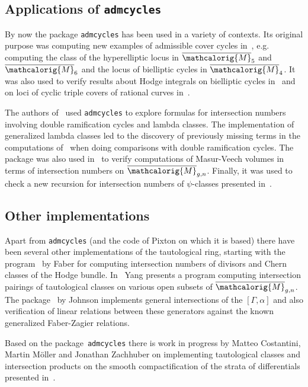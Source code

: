 \documentclass[11pt]{article}
\newcommand{\M}{\ensuremath{\overline{\mathcalorig{M}}}}
\newcommand{\admcycles}{\texttt{admcycles}}
\begin{document}
\subsection*{Applications of \admcycles{}}
By now the package \admcycles{} has been used in a variety of contexts. Its original purpose was computing new examples of admissible cover cycles in~\cite{schmittvanzelm}, e.g. computing the class of the hyperelliptic locus in $\overline{\mathcalorig{M}}_5$ and $\overline{\mathcalorig{M}}_6$ and the locus of bielliptic cycles in $\overline{\mathcalorig{M}}_4$. It was also used to verify results about Hodge integrals on bielliptic cycles in~\cite{hurwitzhodge} and on loci of cyclic triple covers of rational curves in~\cite{somerstep}.

The authors of~\cite{rossiburyak} used \admcycles{} to explore formulas for intersection numbers involving double ramification cycles and lambda classes. The implementation of generalized lambda classes led to the discovery of previously missing terms in the computations of~\cite{PRvZ} when doing comparisons with double ramification cycles. The package was also used in~\cite{2019arXiv191202267C} to verify computations of Masur-Veech volumes in terms of intersection numbers on $\overline{\mathcalorig{M}}_{g,n}$. Finally, it was used to check a new recursion for intersection numbers of $\psi$-classes presented in~\cite{2019arXiv190312526G}.


\subsection*{Other implementations}
Apart from \admcycles{} (and the code of Pixton on which it is based) there have been several other implementations of the tautological ring,  starting with the program~\cite{faberdivisors} by Faber for computing intersection numbers of divisors and Chern classes of the Hodge bundle. In~\cite{Yang2008} Yang presents a program computing intersection pairings of tautological classes on various open subsets of $\M_{g,n}$. The package~\cite{djohnson} by Johnson implements general intersections of the $[\Gamma, \alpha]$ and also verification of linear relations between these generators against the known generalized Faber-Zagier relations.

Based on the package~\admcycles{} there is work in progress by Matteo Costantini, Martin M\"oller and Jonathan Zachhuber on implementing tautological classes and intersection products on the smooth compactification of the strata of differentials presented in~\cite{BCGGM3}.
\end{document}
